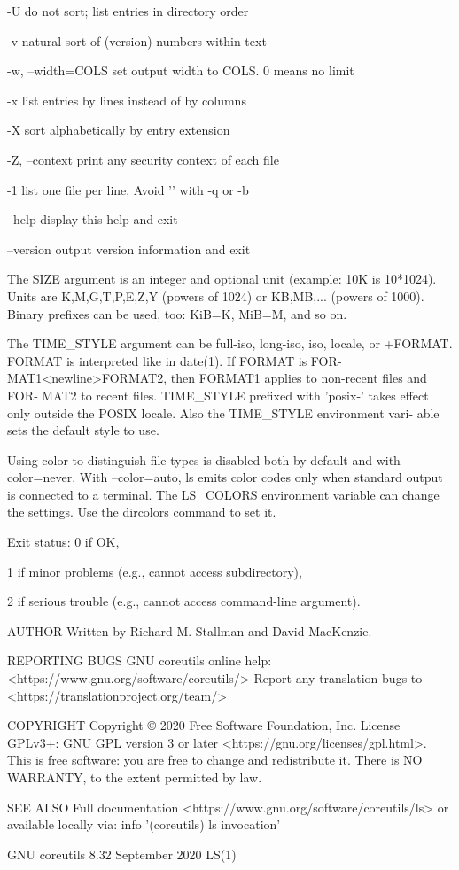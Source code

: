 \documentclass{article}
\begin{document}
       -U     do not sort; list entries in directory order

       -v     natural sort of (version) numbers within text

       -w, --width=COLS
              set output width to COLS.  0 means no limit

       -x     list entries by lines instead of by columns

       -X     sort alphabetically by entry extension

       -Z, --context
              print any security context of each file

       -1     list one file per line.  Avoid '\n' with -q or -b

       --help display this help and exit

       --version
              output version information and exit

       The  SIZE  argument  is  an  integer and optional unit (example: 10K is
       10*1024).  Units are K,M,G,T,P,E,Z,Y  (powers  of  1024)  or  KB,MB,...
       (powers  of 1000).  Binary prefixes can be used, too: KiB=K, MiB=M, and
       so on.

       The TIME_STYLE argument can be  full-iso,  long-iso,  iso,  locale,  or
       +FORMAT.   FORMAT  is  interpreted  like in date(1).  If FORMAT is FOR‐
       MAT1<newline>FORMAT2, then FORMAT1 applies to non-recent files and FOR‐
       MAT2  to  recent files.  TIME_STYLE prefixed with 'posix-' takes effect
       only outside the POSIX locale.  Also the TIME_STYLE  environment  vari‐
       able sets the default style to use.

       Using  color  to distinguish file types is disabled both by default and
       with --color=never.  With --color=auto, ls emits color codes only  when
       standard  output is connected to a terminal.  The LS_COLORS environment
       variable can change the settings.  Use the dircolors command to set it.

   Exit status:
       0      if OK,

       1      if minor problems (e.g., cannot access subdirectory),

       2      if serious trouble (e.g., cannot access command-line argument).

AUTHOR
       Written by Richard M. Stallman and David MacKenzie.

REPORTING BUGS
       GNU coreutils online help: <https://www.gnu.org/software/coreutils/>
       Report any translation bugs to <https://translationproject.org/team/>

COPYRIGHT
       Copyright © 2020 Free Software Foundation, Inc.   License  GPLv3+:  GNU
       GPL version 3 or later <https://gnu.org/licenses/gpl.html>.
       This  is  free  software:  you  are free to change and redistribute it.
       There is NO WARRANTY, to the extent permitted by law.

SEE ALSO
       Full documentation <https://www.gnu.org/software/coreutils/ls>
       or available locally via: info '(coreutils) ls invocation'

GNU coreutils 8.32              September 2020                           LS(1)
\end{document}
